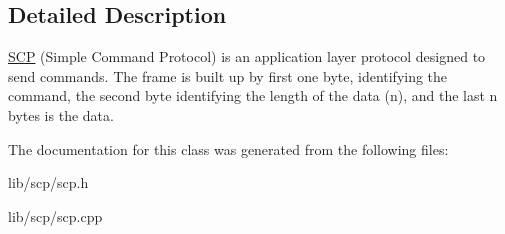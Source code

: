 \subsection{Detailed Description}
\hyperlink{class_s_c_p}{S\-C\-P} (Simple Command Protocol) is an application layer protocol designed to send commands. The frame is built up by first one byte, identifying the command, the second byte identifying the length of the data (n), and the last n bytes is the data. 

The documentation for this class was generated from the following files\-:\begin{DoxyCompactItemize}
\item 
lib/scp/scp.\-h\item 
lib/scp/scp.\-cpp\end{DoxyCompactItemize}
